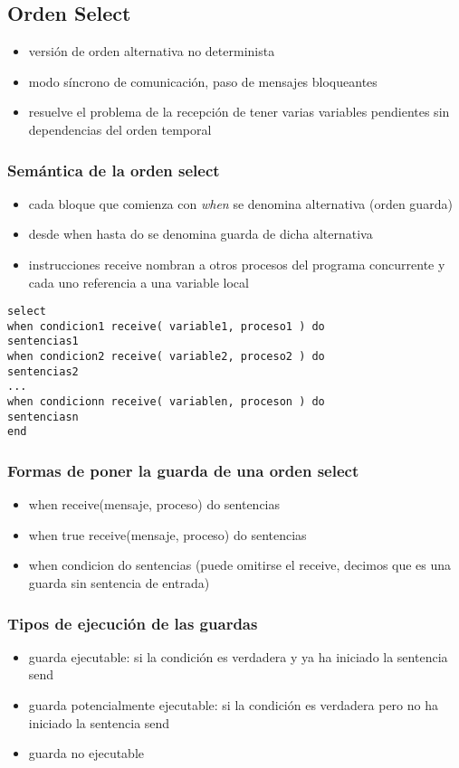 \documentclass[a4paper,12pt]{article}
\begin{document}
\subsection{Orden Select}
\begin{itemize}
    \item versión de orden alternativa no determinista
    \item modo síncrono de comunicación, paso de mensajes bloqueantes
    \item resuelve el problema de la recepción de tener varias variables pendientes sin dependencias del orden temporal
\end{itemize}

\subsubsection{Semántica de la orden select}
\begin{itemize}
    \item cada bloque que comienza con \textit{when} se denomina alternativa (orden guarda)
    \item desde when hasta do se denomina guarda de dicha alternativa
    \item instrucciones receive nombran a otros procesos del programa concurrente y cada uno referencia a una variable local
\end{itemize}
\begin{lstlisting}[style=customcpp]
    select
when condicion1 receive( variable1, proceso1 ) do
sentencias1
when condicion2 receive( variable2, proceso2 ) do
sentencias2
...
when condicionn receive( variablen, proceson ) do
sentenciasn
end
\end{lstlisting}

\subsubsection{Formas de poner la guarda de una orden select}

\begin{itemize}
    \item when receive(mensaje, proceso) do sentencias 
    \item when true receive(mensaje, proceso) do sentencias
    \item when condicion do sentencias (puede omitirse el receive, decimos que es una guarda sin sentencia de entrada)
\end{itemize}

\subsubsection{Tipos de ejecución de las guardas}
\begin{itemize}
    \item guarda ejecutable: si la condición es verdadera y ya ha iniciado la sentencia send
    \item guarda potencialmente ejecutable: si la condición es verdadera pero no ha iniciado la sentencia send
    \item guarda no ejecutable
\end{itemize}
\end{document}
